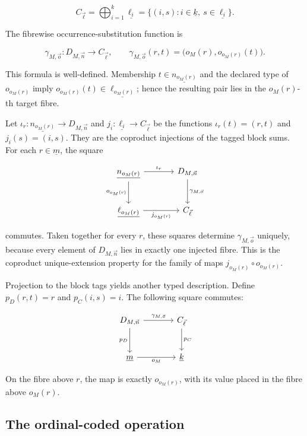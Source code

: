 \documentclass[11pt]{article}
\newcommand{\finord}[1]{\underline{#1}}
\begin{document}
\[
C_{\vec\ell}
=\bigoplus_{i=1}^{k}\finord{\ell_i}
=\{(i,s):i\in\finord k,\ s\in\finord{\ell_i}\}.
\]

The fibrewise occurrence-substitution function is

\[
\gamma_{M,\vec o}:D_{M,\vec n}\longrightarrow C_{\vec\ell},
\qquad
\gamma_{M,\vec o}(r,t)
=\bigl(o_M(r),o_{o_M(r)}(t)\bigr).
\]

This formula is well-defined. Membership
\(t\in\finord{n_{o_M(r)}}\) and the declared type of
\(o_{o_M(r)}\) imply
\(o_{o_M(r)}(t)\in\finord{\ell_{o_M(r)}}\); hence the resulting pair lies in
the \(o_M(r)\)-th target fibre.

Let
\(\iota_r:\finord{n_{o_M(r)}}\to D_{M,\vec n}\) and
\(j_i:\finord{\ell_i}\to C_{\vec\ell}\) be the functions
\(\iota_r(t)=(r,t)\) and \(j_i(s)=(i,s)\). They are the coproduct
injections of the tagged block sums. For each \(r\in\finord m\), the square

\[
\begin{tikzcd}[row sep=large,column sep=large]
\finord{n_{o_M(r)}} \arrow[r,"\iota_r"]
  \arrow[d,"o_{o_M(r)}"'] &
D_{M,\vec n} \arrow[d,"\gamma_{M,\vec o}"] \\
\finord{\ell_{o_M(r)}} \arrow[r,"j_{o_M(r)}"'] & C_{\vec\ell}
\end{tikzcd}
\]

commutes. Taken together for every \(r\), these squares determine
\(\gamma_{M,\vec o}\) uniquely, because every element of
\(D_{M,\vec n}\) lies in exactly one injected fibre.
This is the coproduct unique-extension property for the family of maps
\(j_{o_M(r)}\circ o_{o_M(r)}\).

Projection to the block tags yields another typed description. Define
\(p_D(r,t)=r\) and \(p_C(i,s)=i\). The following square commutes:

\[
\begin{tikzcd}[row sep=large,column sep=large]
D_{M,\vec n} \arrow[r,"\gamma_{M,\vec o}"] \arrow[d,"p_D"'] &
C_{\vec\ell} \arrow[d,"p_C"] \\
\finord m \arrow[r,"o_M"'] & \finord k
\end{tikzcd}
\]

On the fibre above \(r\), the map is exactly
\(o_{o_M(r)}\), with its value placed in the fibre above \(o_M(r)\).

\subsection{The ordinal-coded operation}
\end{document}
